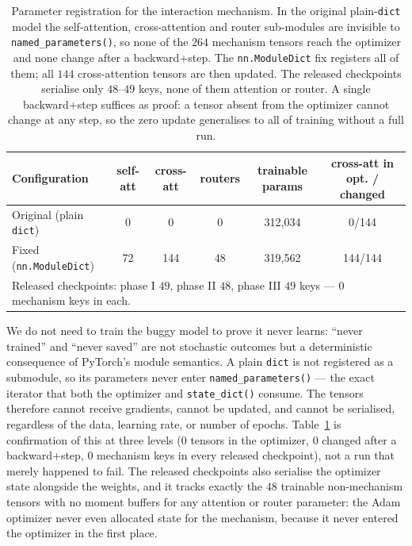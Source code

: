 \documentclass[a4paper,fleqn]{cas-sc}
\begin{document}
\begin{table}[t]
\centering\small
\caption{Parameter registration for the interaction mechanism. In the original
plain-\texttt{dict} model the self-attention, cross-attention and router sub-modules are
invisible to \texttt{named\_parameters()}, so none of the $264$ mechanism tensors reach the
optimizer and none change after a backward+step. The \texttt{nn.ModuleDict} fix registers
all of them; all $144$ cross-attention tensors are then updated. The released checkpoints
serialise only $48$--$49$ keys, none of them attention or router. A single backward+step
suffices as proof: a tensor absent from the optimizer cannot change at any step, so the
zero update generalises to all of training without a full run.}
\label{tab:paramreg}
\begin{tabular}{lccccc}
\toprule
Configuration & self-att & cross-att & routers & trainable params & cross-att in opt. / changed \\
\midrule
Original (plain \texttt{dict})   & 0  & 0   & 0  & 312{,}034 & 0/144 \\
Fixed (\texttt{nn.ModuleDict})   & 72 & 144 & 48 & 319{,}562 & 144/144 \\
\midrule
\multicolumn{6}{l}{Released checkpoints: phase I $49$, phase II $48$, phase III $49$ keys --- $0$ mechanism keys in each.} \\
\bottomrule
\end{tabular}
\end{table}
We do not need to train the buggy model to prove it never learns: ``never trained'' and
``never saved'' are not stochastic outcomes but a deterministic consequence of PyTorch's
module semantics. A plain \texttt{dict} is not registered as a submodule, so its parameters
never enter \texttt{named\_parameters()} --- the exact iterator that both the optimizer and
\texttt{state\_dict()} consume. The tensors therefore cannot receive gradients, cannot be
updated, and cannot be serialised, regardless of the data, learning rate, or number of
epochs. Table~\ref{tab:paramreg} is confirmation of this at three levels ($0$ tensors in the
optimizer, $0$ changed after a backward+step, $0$ mechanism keys in every released
checkpoint), not a run that merely happened to fail. The released checkpoints also serialise
the optimizer state alongside the weights, and it tracks exactly the $48$ trainable
non-mechanism tensors with no moment buffers for any attention or router parameter: the
Adam optimizer never even allocated state for the mechanism, because it never entered the
optimizer in the first place.
\end{document}
